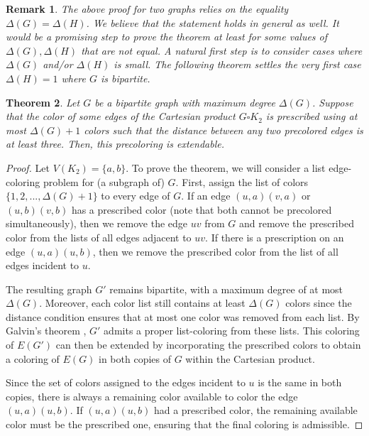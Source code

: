 \documentclass[a4paper,12pt]{article}
\newtheorem{theorem}{\bf Theorem}[section]
\newtheorem{remark}[theorem]{\bf Remark}
\begin{document}
\begin{remark}
    \textup{The above proof for two graphs relies on the equality $\Delta(G)=\Delta(H)$. We believe that the statement holds in general as well. It would be a promising step to prove the theorem at least for some values of $\Delta(G),\Delta(H)$ that are not equal. A natural first step is to consider cases where $\Delta(G)$ and/or $\Delta(H)$ is small. The following theorem settles the very first case $\Delta(H)=1$ where $G$ is bipartite.}
\end{remark}

\begin{theorem} \label{bipartite-times-edge}
    Let $G$ be a bipartite graph with maximum degree $\Delta(G)$. Suppose that the color of some edges of the Cartesian product $G \square K_{2}$ is prescribed using at most $\Delta(G)+1$ colors such that the distance between any two precolored edges is at least three. Then, this precoloring is extendable.
\end{theorem}

\begin{proof}
    Let $V(K_2)=\{a,b\}$. To prove the theorem, we will consider a list edge-coloring problem for (a subgraph of) $G$. First, assign the list of colors $\{1,2,...,\Delta(G)+1\}$ to every edge of $G$. If an edge $(u,a)(v,a)$ or $(u,b)(v,b)$ has a prescribed color (note that both cannot be precolored simultaneously), then we remove the edge $uv$ from $G$ and remove the prescribed color from the lists of all edges adjacent to $uv$. If there is a prescription on an edge $(u,a)(u,b)$, then we remove the prescribed color from the list of all edges incident to $u$.
 
    The resulting graph $G'$ remains bipartite, with a maximum degree of at most $\Delta(G)$. Moreover, each color list still contains at least $\Delta(G)$ colors since the distance condition ensures that at most one color was removed from each list. By Galvin's theorem \cite{Galvin}, $G'$ admits a proper list-coloring from these lists. This coloring of $E(G')$ can then be extended by incorporating the prescribed colors to obtain a coloring of $E(G)$ in both copies of $G$ within the Cartesian product. 

    Since the set of colors assigned to the edges incident to $u$ is the same in both copies, there is always a remaining color available to color the edge $(u,a)(u,b)$. If $(u,a)(u,b)$ had a prescribed color, the remaining available color must be the prescribed one, ensuring that the final coloring is admissible.
\end{proof}
\end{document}
